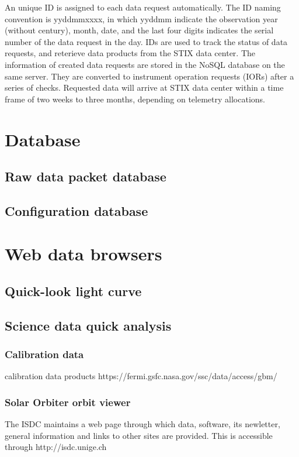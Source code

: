 \documentclass[referee]{aa} %
\begin{document}
An unique ID is assigned to each data request automatically.
The ID naming convention is yyddmmxxxx, in which yyddmm indicate the observation year (without century), month, date,
and the last four digits indicates the serial number of the data request in the day.
IDs are used to track the status of data requests, and reterieve data products from the
STIX data center.
The information of created data requests are stored in the NoSQL database on the same server.
They are converted to instrument operation requests (IORs) after a series of checks.
Requested data will arrive at STIX data center within a time frame of two weeks to three months, depending on
telemetry allocations.

\section{Database}
\subsection{Raw data packet database} 
\subsection{Configuration database}
\section{Web data browsers}
\subsection{Quick-look light curve}
\subsection{Science data quick analysis}
\subsubsection{Calibration data}

calibration data products
https://fermi.gsfc.nasa.gov/ssc/data/access/gbm/
\subsubsection{Solar Orbiter orbit viewer}
The ISDC maintains a web page through which
data, software, its newletter, general information and links
to other sites are provided. This is accessible through
http://isdc.unige.ch
\end{document}
